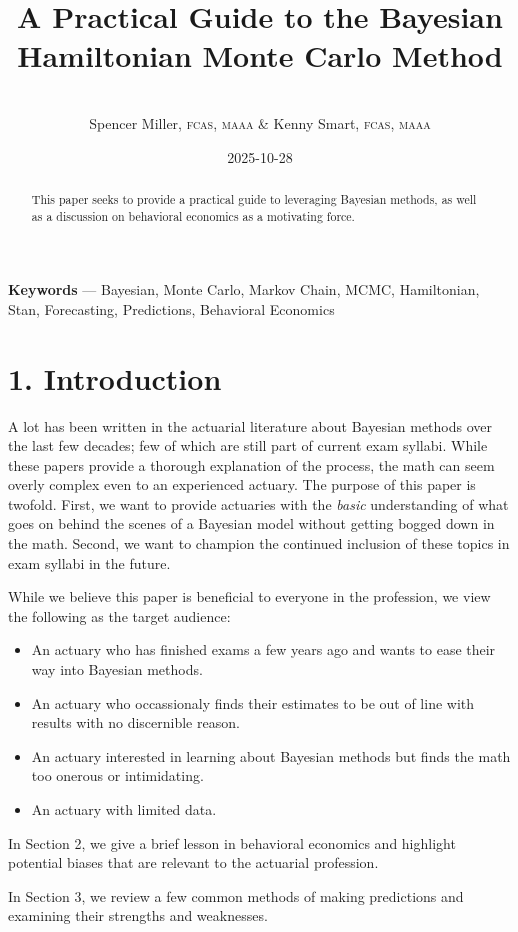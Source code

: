 \documentclass[
]{article}
\title{A Practical Guide to the Bayesian Hamiltonian Monte Carlo Method}
\author{\\
Spencer Miller\textsc{, fcas, maaa} \& Kenny Smart\textsc{, fcas,
maaa}\\}
\date{2025-10-28}
\providecommand{\tightlist}{%
  \setlength{\itemsep}{0pt}\setlength{\parskip}{0pt}}
\begin{document}
\maketitle
\begin{abstract}
This paper seeks to provide a practical guide to leveraging Bayesian
methods, as well as a discussion on behavioral economics as a motivating
force.
\end{abstract}

\textbf{Keywords} --- Bayesian, Monte Carlo, Markov Chain, MCMC,
Hamiltonian, Stan, Forecasting, Predictions, Behavioral Economics

\hypertarget{introduction}{%
\section{1. Introduction}\label{introduction}}

A lot has been written in the actuarial literature about Bayesian
methods over the last few decades; few of which are still part of
current exam syllabi. While these papers provide a thorough explanation
of the process, the math can seem overly complex even to an experienced
actuary. The purpose of this paper is twofold. First, we want to provide
actuaries with the \emph{basic} understanding of what goes on behind the
scenes of a Bayesian model without getting bogged down in the math.
Second, we want to champion the continued inclusion of these topics in
exam syllabi in the future.

While we believe this paper is beneficial to everyone in the profession,
we view the following as the target audience:

\begin{itemize}
\tightlist
\item
  An actuary who has finished exams a few years ago and wants to ease
  their way into Bayesian methods.
\item
  An actuary who occassionaly finds their estimates to be out of line
  with results with no discernible reason.
\item
  An actuary interested in learning about Bayesian methods but finds the
  math too onerous or intimidating.
\item
  An actuary with limited data.
\end{itemize}

In Section 2, we give a brief lesson in behavioral economics and
highlight potential biases that are relevant to the actuarial
profession.

In Section 3, we review a few common methods of making predictions and
examining their strengths and weaknesses.
\end{document}
